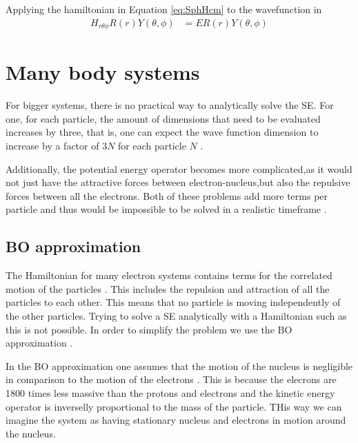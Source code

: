 \documentclass[../master_thesis.tex]{subfiles}
\begin{document}
Applying the hamiltonian in Equation \ref{eq:SphHcm} to the wavefunction in
\begin{equation}
  \begin{split}
    H_{r\theta\phi} R(r)Y(\theta, \phi) &= E R(r)Y(\theta, \phi)
  \end{split}
\end{equation}

\section{Many body systems}

For bigger systems, there is no practical way to analytically solve the
\ac{SE}. For one, for each particle, the amount of dimensions that need to be
evaluated increases by three, that is, one can expect the wave function
dimension to increase by a factor of $3N$ for each particle $N$
\cite{Cramer:2004}.

Additionally, the potential energy operator becomes more complicated,as it
would not just have the attractive forces between electron-nucleus,but also the
repulsive forces between all the electrons. Both of these problems add more
terms per particle and thus would be impossible to be solved in a realistic
timeframe \cite{Jensen:2017}.

\subsection{\ac{BO} approximation}

The Hamiltonian for many electron systems contains terms for the correlated
motion of the particles \cite{Cramer:2004, Jensen:2017}. This includes the
repulsion and attraction of all the particles to each other. This means that no
particle is moving independently of the other particles. Trying to solve a
\ac{SE} analytically with a Hamiltonian such as this is not possible. In order
to simplify the problem we use the \ac{BO} approximation \cite{Cramer:2004,
Jensen:2017}.

In the \ac{BO} approximation one assumes that the motion of the nucleus is
negligible in comparison to the motion of the electrons \cite{Cramer:2004,
Jensen:2017}. This is because the elecrons are 1800 times less massive than the
protons and electrons and the kinetic energy operator is inverselly
proportional to the mass of the particle. THis way we can imagine the system as
having stationary nucleus and electrons in motion around the nucleus.
\end{document}

